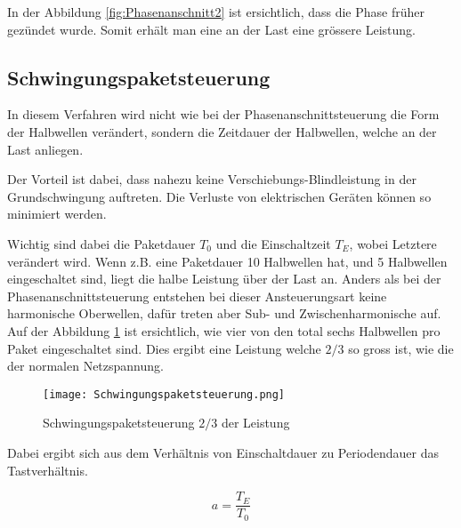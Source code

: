 In der Abbildung \ref{fig:Phasenanschnitt2} ist ersichtlich, dass die Phase früher gezündet wurde. Somit erhält man eine an der Last eine grössere Leistung.



\subsection{Schwingungspaketsteuerung}
In diesem Verfahren wird nicht wie bei der Phasenanschnittsteuerung die Form der Halbwellen verändert, sondern die Zeitdauer der Halbwellen, welche an der Last anliegen. 

Der Vorteil ist dabei, dass nahezu keine Verschiebungs-Blindleistung in der Grundschwingung auftreten. Die Verluste von elektrischen Geräten können so minimiert werden.


 Wichtig sind dabei die Paketdauer $T_0$ und die Einschaltzeit $T_E$, wobei Letztere verändert wird. Wenn z.B. eine Paketdauer 10 Halbwellen hat, und 5 Halbwellen eingeschaltet sind, liegt die halbe Leistung über der Last an. Anders als bei der Phasenanschnittsteuerung entstehen bei dieser Ansteuerungsart keine harmonische Oberwellen, dafür treten aber Sub- und Zwischenharmonische auf. Auf der Abbildung \ref{fig:Schwingungspaketsteuerung} ist ersichtlich, wie vier von den total sechs Halbwellen pro Paket eingeschaltet sind. Dies ergibt eine Leistung welche ${2}/{3}$ so gross ist, wie die der normalen Netzspannung.

\begin{figure}[ht!]
	\centering
	\texttt{[image: Schwingungspaketsteuerung.png]}	
	\caption{Schwingungspaketsteuerung ${2}/{3}$ der Leistung \cite{Schwingungspaketsteuerung}}\label{fig:Schwingungspaketsteuerung}
\end{figure}

Dabei ergibt sich aus dem Verhältnis von Einschaltdauer zu Periodendauer das Tastverhältnis.

\begin{equation}\label{eq:Einschaltverhältnis}
a = \frac{T_E}{T_0}
\end{equation}




